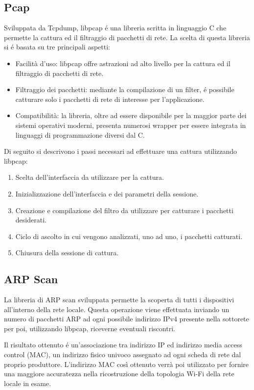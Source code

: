 \subsection{Pcap}

Sviluppata da Tcpdump, libpcap  \'e una libreria scritta in linguaggio C che permette la cattura ed il filtraggio di pacchetti di rete.
La scelta di questa libreria si \'e basata su tre principali aspetti:
\begin{itemize}
	\item Facilit\`a d'uso: libpcap offre astrazioni ad alto livello per la cattura ed il filtraggio di pacchetti di rete.
	\item Filtraggio dei pacchetti: mediante la compilazione di un filter, \'e possibile catturare solo i pacchetti di rete di interesse per l'applicazione.  
	\item Compatibilit\`a: la libreria, oltre ad essere disponibile per la maggior parte dei sistemi operativi moderni, presenta numerosi wrapper per essere integrata in linguaggi di programmazione diversi dal C.
\end{itemize}
Di seguito si descrivono i passi necessari ad effettuare una cattura utilizzando libpcap:
\begin{enumerate}
	\item Scelta dell'interfaccia da utilizzare per la cattura.
	\item Inizializzazione dell'interfaccia e dei parametri della sessione.
	\item Creazione e compilazione del filtro da utilizzare per catturare i pacchetti desiderati. 
	\item Ciclo di ascolto in cui vengono analizzati, uno ad uno, i pacchetti catturati.
	\item Chiusura della sessione di cattura.
\end{enumerate}


\subsection{ARP Scan}

La libreria di ARP scan sviluppata permette la scoperta di tutti i dispositivi all'interno della rete locale.
Questa operazione viene effettuata inviando un numero di pacchetti ARP ad ogni possibile indirizzo IPv4 presente nella sottorete per poi, utilizzando libpcap, riceverne eventuali riscontri.

Il risultato ottenuto \'e un'associazione tra indirizzo IP ed indirizzo media access control (MAC), un indirizzo fisico univoco assegnato ad ogni scheda di rete dal proprio produttore.
L'indirizzo MAC cos\`i ottenuto verr\`a poi utilizzato per fornire una maggiore accuratezza nella ricostruzione della topologia Wi-Fi della rete locale in esame.

